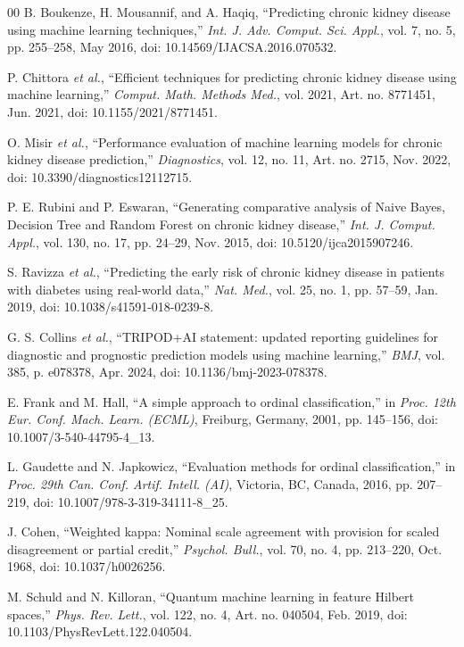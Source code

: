 \documentclass[10pt,conference]{IEEEtran}
\begin{document}
{\begin{thebibliography}{00}
B. Boukenze, H. Mousannif, and A. Haqiq, ``Predicting chronic kidney disease using machine learning techniques,'' \emph{Int. J. Adv. Comput. Sci. Appl.}, vol. 7, no. 5, pp. 255--258, May 2016, doi: 10.14569/IJACSA.2016.070532.

P. Chittora \emph{et al.}, ``Efficient techniques for predicting chronic kidney disease using machine learning,'' \emph{Comput. Math. Methods Med.}, vol. 2021, Art. no. 8771451, Jun. 2021, doi: 10.1155/2021/8771451.

O. Misir \emph{et al.}, ``Performance evaluation of machine learning models for chronic kidney disease prediction,'' \emph{Diagnostics}, vol. 12, no. 11, Art. no. 2715, Nov. 2022, doi: 10.3390/diagnostics12112715.

P. E. Rubini and P. Eswaran, ``Generating comparative analysis of Naive Bayes, Decision Tree and Random Forest on chronic kidney disease,'' \emph{Int. J. Comput. Appl.}, vol. 130, no. 17, pp. 24--29, Nov. 2015, doi: 10.5120/ijca2015907246.

S. Ravizza \emph{et al.}, ``Predicting the early risk of chronic kidney disease in patients with diabetes using real-world data,'' \emph{Nat. Med.}, vol. 25, no. 1, pp. 57--59, Jan. 2019, doi: 10.1038/s41591-018-0239-8.

G. S. Collins \emph{et al.}, ``TRIPOD+AI statement: updated reporting guidelines for diagnostic and prognostic prediction models using machine learning,'' \emph{BMJ}, vol. 385, p. e078378, Apr. 2024, doi: 10.1136/bmj-2023-078378.

E. Frank and M. Hall, ``A simple approach to ordinal classification,'' in \emph{Proc. 12th Eur. Conf. Mach. Learn. (ECML)}, Freiburg, Germany, 2001, pp. 145--156, doi: 10.1007/3-540-44795-4\_13.

L. Gaudette and N. Japkowicz, ``Evaluation methods for ordinal classification,'' in \emph{Proc. 29th Can. Conf. Artif. Intell. (AI)}, Victoria, BC, Canada, 2016, pp. 207--219, doi: 10.1007/978-3-319-34111-8\_25.

J. Cohen, ``Weighted kappa: Nominal scale agreement with provision for scaled disagreement or partial credit,'' \emph{Psychol. Bull.}, vol. 70, no. 4, pp. 213--220, Oct. 1968, doi: 10.1037/h0026256.

M. Schuld and N. Killoran, ``Quantum machine learning in feature Hilbert spaces,'' \emph{Phys. Rev. Lett.}, vol. 122, no. 4, Art. no. 040504, Feb. 2019, doi: 10.1103/PhysRevLett.122.040504.


\end{thebibliography}}
\end{document}
